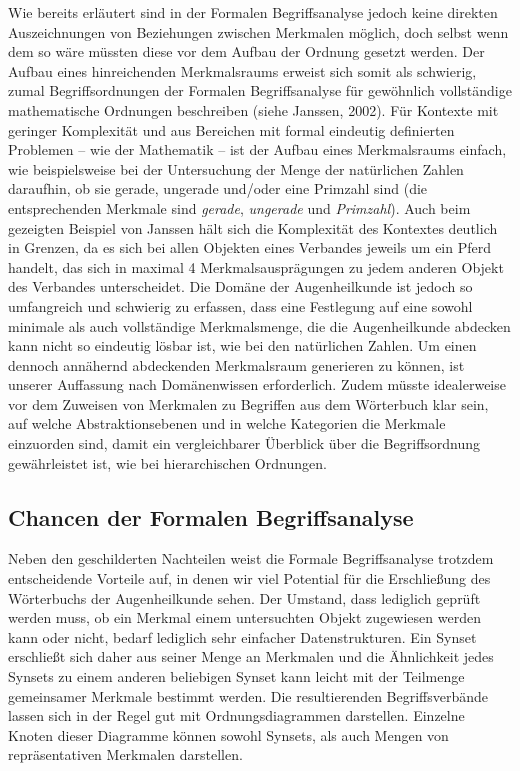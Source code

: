 \documentclass[pagesize,paper=A4,DIV=calc,fontsize=12pt,draft=false]{scrreprt}
\begin{document}
Wie bereits erläutert sind in der Formalen Begriffsanalyse jedoch keine direkten Auszeichnungen von Beziehungen zwischen Merkmalen möglich, doch selbst wenn dem so wäre müssten diese vor dem Aufbau der Ordnung gesetzt werden. 
Der Aufbau eines hinreichenden Merkmalsraums erweist sich somit als schwierig, zumal Begriffsordnungen der Formalen Begriffsanalyse für gewöhnlich vollständige mathematische Ordnungen beschreiben (siehe Janssen, 2002). 
Für Kontexte mit geringer Komplexität und aus Bereichen mit formal eindeutig definierten Problemen -- wie der Mathematik -- ist der Aufbau eines Merkmalsraums einfach, wie beispielsweise bei der Untersuchung der Menge der natürlichen Zahlen daraufhin, ob sie gerade, ungerade und/oder eine Primzahl sind (die entsprechenden Merkmale sind \emph{gerade}, \emph{ungerade} und \emph{Primzahl}). 
Auch beim gezeigten Beispiel von Janssen hält sich die Komplexität des Kontextes deutlich in Grenzen, da es sich bei allen Objekten eines Verbandes jeweils um ein Pferd handelt, das sich in maximal 4 Merkmalsausprägungen zu jedem anderen Objekt des Verbandes unterscheidet. 
Die Domäne der Augenheilkunde ist jedoch so umfangreich und schwierig zu erfassen, dass eine Festlegung auf eine sowohl minimale als auch vollständige Merkmalsmenge, die die Augenheilkunde abdecken kann nicht so eindeutig lösbar ist, wie bei den natürlichen Zahlen. 
Um einen dennoch annähernd abdeckenden Merkmalsraum generieren zu können, ist unserer Auffassung nach Domänenwissen erforderlich. 
Zudem müsste idealerweise vor dem Zuweisen von Merkmalen zu Begriffen aus dem Wörterbuch klar sein, auf welche Abstraktionsebenen und in welche Kategorien die Merkmale einzuorden sind, damit ein vergleichbarer Überblick über die Begriffsordnung gewährleistet ist, wie bei hierarchischen Ordnungen. 

\subsection{Chancen der Formalen Begriffsanalyse}

Neben den geschilderten Nachteilen weist die Formale Begriffsanalyse trotzdem entscheidende Vorteile auf, in denen wir viel Potential für die Erschließung des Wörterbuchs der Augenheilkunde sehen. 
Der Umstand, dass lediglich geprüft werden muss, ob ein Merkmal einem untersuchten Objekt zugewiesen werden kann oder nicht, bedarf lediglich sehr einfacher Datenstrukturen.
Ein Synset erschließt sich daher aus seiner Menge an Merkmalen und die Ähnlichkeit jedes Synsets zu einem anderen beliebigen Synset kann leicht mit der Teilmenge gemeinsamer Merkmale bestimmt werden.
Die resultierenden Begriffsverbände lassen sich in der Regel gut mit Ordnungsdiagrammen darstellen.
Einzelne Knoten dieser Diagramme können sowohl Synsets, als auch Mengen von repräsentativen Merkmalen darstellen. 
\end{document}
